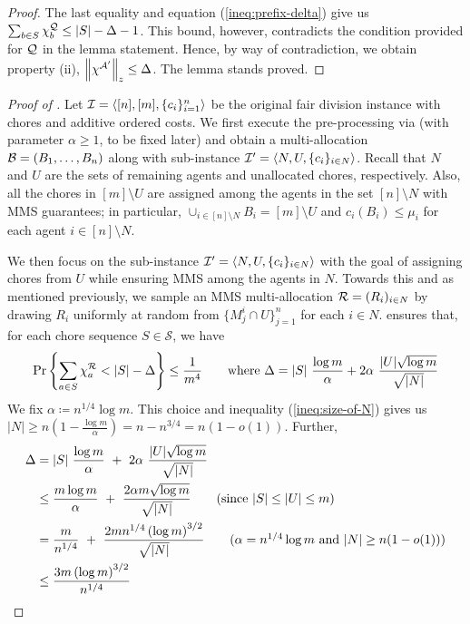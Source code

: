 \begin{proof}
    The last equality and equation (\ref{ineq:prefix-delta}) give us $\sum_{b \in S} \chi^{\mathcal{Q}}_b \leq |S| - \Delta -1$. This bound, however, contradicts the condition provided for $\mathcal{Q}$ in the lemma statement. Hence, by way of contradiction, we obtain property (ii), $\left\|\chi^{\mathcal{A}'}\right\|_z \leq \Delta$. The lemma stands proved. 
\end{proof}

\medskip

    \begin{proof}[Proof of ]

    Let $\mathcal{I}=\langle[n],[m],\{c_i\}_{i=1}^n\rangle$ be the original fair division instance with chores and additive ordered costs. We first execute the pre-processing via  (with parameter $\alpha \geq 1$, to be fixed later) and obtain a multi-allocation $\mathcal{B}=(B_1,\ldots,B_n)$ along with sub-instance $\mathcal{I}'=\langle N,U,\{c_i\}_{i\in N}\rangle$. Recall that $N$ and $U$ are the sets of remaining agents and unallocated chores, respectively. Also, all the chores in $[m] \setminus U$ are assigned among the agents in the set $[n] \setminus N$ with MMS guarantees; in particular, $\cup_{i \in [n] \setminus N} B_i = [m] \setminus U$ and $c_i(B_i) \leq \mu_i$ for each agent $i \in [n] \setminus N$.  
    
    We then focus on the sub-instance $\mathcal{I}'=\langle N,U,\{c_i\}_{i\in N}\rangle$ with the goal of assigning chores from $U$ while ensuring MMS among the agents in $N$. Towards this and as mentioned previously, we sample an MMS multi-allocation $\mathcal{R}=(R_i)_{i\in N}$ by drawing $R_i$ uniformly at random from $\{M^i_j\cap U\}_{j=1}^n$ for each $i\in N$.  ensures that, for each chore sequence $S\in \mathcal{S}$, we have  
    \begin{align}
        \Pr \left\{\sum_{a\in S} \chi^{\mathcal{R}}_a < |S|-\Delta\right\}\leq \frac{1}{m^4}  \qquad \text{where } \Delta =|S|\ \frac{\log m}{\alpha} +2\alpha\ \frac{|U| \sqrt{\log m}}{\sqrt{|N|}} \label{eq:each-sequence}
    \end{align} 
    We fix $\alpha \coloneqq  n^{1/4} \log m$. This choice and inequality (\ref{ineq:size-of-N}) gives us $|N| \geq n \left(1 - \frac{\log m}{\alpha} \right) = n - n^{3/4} = n(1 - o(1))$. Further, 
     \begin{align}
        \Delta & =|S|\ \frac{\log m}{\alpha} \ + \ 2\alpha\ \frac{|U| \sqrt{\log m}}{\sqrt{|N|}} \nonumber \\ 
        & \leq \frac{m\log m}{\alpha} \ + \ \frac{2\alpha m\sqrt{\log m}}{\sqrt{|N|}} \tag{since $|S| \leq |U| \leq m$} \\
        & = \frac{m}{n^{1/4}}  \ + \ \frac{2  m n^{1/4} \left( \log m \right)^{3/2}}{ \sqrt{|N|} } \tag{$\alpha = n^{1/4} \log m$ and $|N| \geq n(1- o(1))$} \\
        & \leq \frac{3  m \left(\log  m \right)^{3/2}}{n^{1/4}} \label{eq:eq_alpha}
    \end{align}
    

\end{proof}
